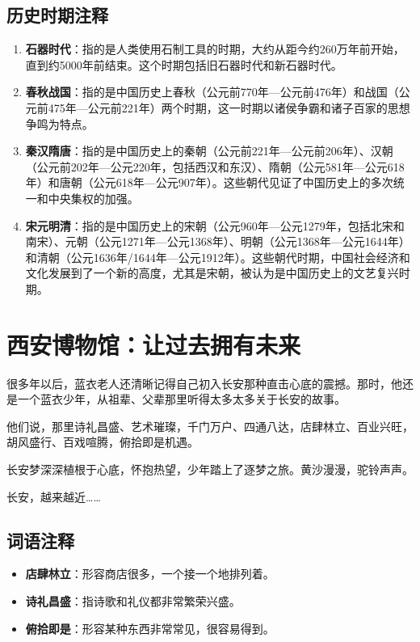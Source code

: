 \subsection*{历史时期注释}

\begin{enumerate}[leftmargin=*]
    \item \textbf{石器时代}：指的是人类使用石制工具的时期，大约从距今约260万年前开始，直到约5000年前结束。这个时期包括旧石器时代和新石器时代。
    
    \item \textbf{春秋战国}：指的是中国历史上春秋（公元前770年—公元前476年）和战国（公元前475年—公元前221年）两个时期，这一时期以诸侯争霸和诸子百家的思想争鸣为特点。
    
    \item \textbf{秦汉隋唐}：指的是中国历史上的秦朝（公元前221年—公元前206年）、汉朝（公元前202年—公元220年，包括西汉和东汉）、隋朝（公元581年—公元618年）和唐朝（公元618年—公元907年）。这些朝代见证了中国历史上的多次统一和中央集权的加强。
    
    \item \textbf{宋元明清}：指的是中国历史上的宋朝（公元960年—公元1279年，包括北宋和南宋）、元朝（公元1271年—公元1368年）、明朝（公元1368年—公元1644年）和清朝（公元1636年/1644年—公元1912年）。这些朝代时期，中国社会经济和文化发展到了一个新的高度，尤其是宋朝，被认为是中国历史上的文艺复兴时期。
\end{enumerate}

\newpage

\section*{西安博物馆：让过去拥有未来}

很多年以后，蓝衣老人还清晰记得自己初入长安那种直击心底的震撼。那时，他还是一个蓝衣少年，从祖辈、父辈那里听得太多太多关于长安的故事。

他们说，那里诗礼昌盛、艺术璀璨，千门万户、四通八达，店肆林立、百业兴旺，胡风盛行、百戏喧腾，俯拾即是机遇。

长安梦深深植根于心底，怀抱热望，少年踏上了逐梦之旅。黄沙漫漫，驼铃声声。

长安，越来越近……

\subsection*{词语注释}

\begin{itemize}[leftmargin=*]
    \item \textbf{店肆林立}：形容商店很多，一个接一个地排列着。
    \item \textbf{诗礼昌盛}：指诗歌和礼仪都非常繁荣兴盛。
    \item \textbf{俯拾即是}：形容某种东西非常常见，很容易得到。
\end{itemize}

